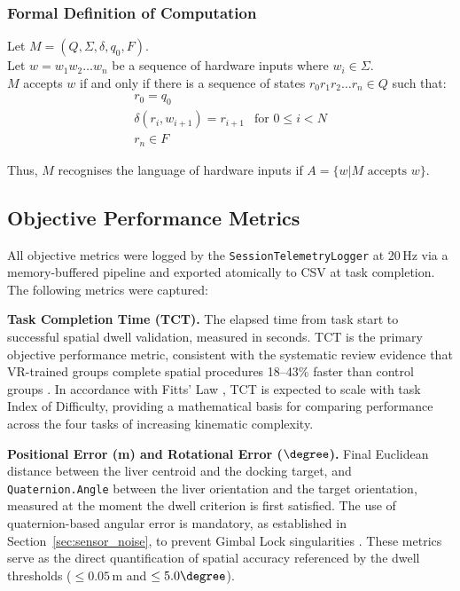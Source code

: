 \subsubsection{Formal Definition of Computation}
\label{}
Let $M = (Q, \Sigma, \delta, q_0, F)$. \\
Let $w = w_1w_2\dots w_n$ be a sequence of hardware inputs where $w_i \in \Sigma$. \\
$M$ accepts $w$ if and only if there is a sequence of states $r_0r_1r_2\dots r_n \in Q$ such that: \[
\begin{matrix}
   r_0=q_0 \\
   \delta(r_i, w_{i+1}) = r_{i+1} & \text{for } 0\le i < N \\
   r_n \in F
\end{matrix}
\]

Thus, $M$ recognises the language of hardware inputs if $A=\{w|M \text{ accepts } w\}.$


\subsection{Objective Performance Metrics}
\label{sec:objective_metrics}

All objective metrics were logged by the \texttt{SessionTelemetryLogger} at 20\,Hz via a memory-buffered pipeline and exported atomically to CSV at task completion. The following metrics were captured:

\textbf{Task Completion Time (TCT).} The elapsed time from task start to successful spatial dwell validation, measured in seconds. TCT is the primary objective performance metric, consistent with the systematic review evidence that VR-trained groups complete spatial procedures 18--43\% faster than control groups \citep{Mao2021ImmersiveReview}. In accordance with Fitts' Law \citep{Soukoreff2004TowardsHCI}, TCT is expected to scale with task Index of Difficulty, providing a mathematical basis for comparing performance across the four tasks of increasing kinematic complexity.

\textbf{Positional Error (m) and Rotational Error ($\degree$).} Final Euclidean distance between the liver centroid and the docking target, and \texttt{Quaternion.Angle} between the liver orientation and the target orientation, measured at the moment the dwell criterion is first satisfied. The use of quaternion-based angular error is mandatory, as established in Section~\ref{sec:sensor_noise}, to prevent Gimbal Lock singularities \citep{Fang1998RealQuaternions}. These metrics serve as the direct quantification of spatial accuracy referenced by the dwell thresholds ($\leq 0.05$\,m and $\leq 5.0\degree$).

